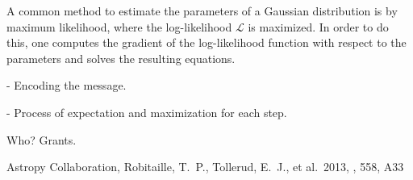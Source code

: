 \documentclass{aastex61}
\begin{document}
A common method to estimate the parameters of a Gaussian distribution is by
maximum likelihood, where the log-likelihood $\mathcal{L}$ is maximized. In
order to do this, one computes the gradient of the log-likelihood function
with respect to the parameters and solves the resulting equations.


- Encoding the message.


- Process of expectation and maximization for each step.


\acknowledgments
Who?
Grants.


\begin{thebibliography}{}

 Astropy Collaboration, Robitaille, T.~P., Tollerud, E.~J., et al.\ 2013, \aap, 558, A33 

\end{thebibliography}
\end{document}
